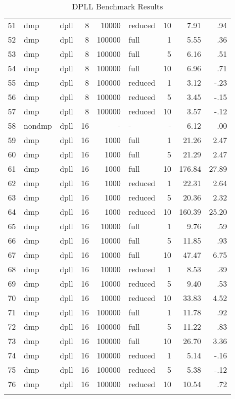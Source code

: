 \begin{center}
\begin{small}
\begin{longtable}{rllrrlrrr}
51 & dmp & dpll & 8 & 10000 & reduced & 10 & 7.91 & .94\\
52 & dmp & dpll & 8 & 100000 & full & 1 & 5.55 & .36\\
53 & dmp & dpll & 8 & 100000 & full & 5 & 6.16 & .51\\
54 & dmp & dpll & 8 & 100000 & full & 10 & 6.96 & .71\\
55 & dmp & dpll & 8 & 100000 & reduced & 1 & 3.12 & -.23\\
56 & dmp & dpll & 8 & 100000 & reduced & 5 & 3.45 & -.15\\
57 & dmp & dpll & 8 & 100000 & reduced & 10 & 3.57 & -.12\\
\hline
58 & nondmp & dpll & 16 & - & - & - & 6.12 & .00\\
59 & dmp & dpll & 16 & 1000 & full & 1 & 21.26 & 2.47\\
60 & dmp & dpll & 16 & 1000 & full & 5 & 21.29 & 2.47\\
61 & dmp & dpll & 16 & 1000 & full & 10 & 176.84 & 27.89\\
62 & dmp & dpll & 16 & 1000 & reduced & 1 & 22.31 & 2.64\\
63 & dmp & dpll & 16 & 1000 & reduced & 5 & 20.36 & 2.32\\
64 & dmp & dpll & 16 & 1000 & reduced & 10 & 160.39 & 25.20\\
65 & dmp & dpll & 16 & 10000 & full & 1 & 9.76 & .59\\
66 & dmp & dpll & 16 & 10000 & full & 5 & 11.85 & .93\\
67 & dmp & dpll & 16 & 10000 & full & 10 & 47.47 & 6.75\\
68 & dmp & dpll & 16 & 10000 & reduced & 1 & 8.53 & .39\\
69 & dmp & dpll & 16 & 10000 & reduced & 5 & 9.40 & .53\\
70 & dmp & dpll & 16 & 10000 & reduced & 10 & 33.83 & 4.52\\
71 & dmp & dpll & 16 & 100000 & full & 1 & 11.78 & .92\\
72 & dmp & dpll & 16 & 100000 & full & 5 & 11.22 & .83\\
73 & dmp & dpll & 16 & 100000 & full & 10 & 26.70 & 3.36\\
74 & dmp & dpll & 16 & 100000 & reduced & 1 & 5.14 & -.16\\
75 & dmp & dpll & 16 & 100000 & reduced & 5 & 5.38 & -.12\\
76 & dmp & dpll & 16 & 100000 & reduced & 10 & 10.54 & .72\\
\hline
\caption{DPLL Benchmark Results}
\label{tab:dpll_results}
\end{longtable}
\end{small}
\end{center}

